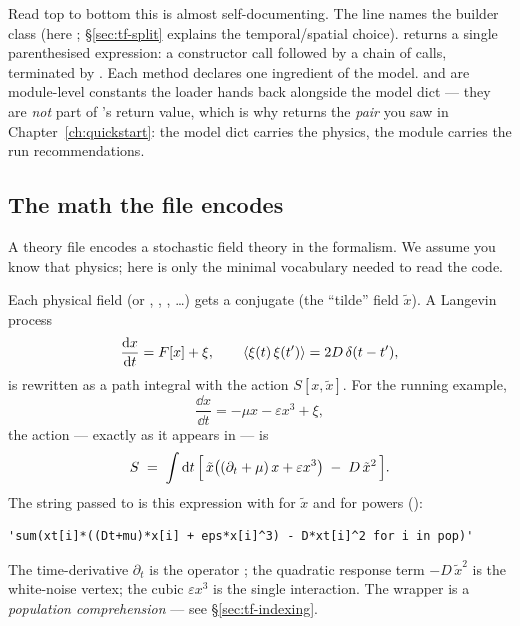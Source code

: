 Read top to bottom this is almost self-documenting. The  line names
the builder class (here ; \S\ref{sec:tf-split}
explains the temporal/spatial choice).  returns a single
parenthesised expression: a constructor call followed by a chain of
 calls, terminated by . Each method declares
one ingredient of the model.  and  are
module-level constants the loader hands back alongside the model dict --- they are
\emph{not} part of 's return value, which is why
 returns the \emph{pair}  you saw in
Chapter~\ref{ch:quickstart}: the model dict carries the physics, the module
carries the run recommendations.

\subsection{The math the file encodes}

A theory file encodes a stochastic field theory in the \msrjd{} formalism. We
assume you know that physics; here is only the minimal vocabulary needed to read
the code.

Each physical field  (or , , , \dots) gets a
conjugate   (the ``tilde'' field $\tilde x$). A
Langevin process
\[
  \frac{\mathrm{d} x}{\mathrm{d} t} = F[x] + \xi,
  \qquad \left\langle \xi(t)\,\xi(t') \right\rangle = 2D\,\delta(t-t'),
\]
is rewritten as a path integral with the \msrjd{} action $S[x,\tilde x]$. For the
running example,
\[
  \frac{\dd x}{\dd t} = -\mu x - \varepsilon x^{3} + \xi,
\]
the action --- exactly as it appears in  --- is
\begin{equation}
  S \;=\; \int \mathrm{d} t \,\Bigl[\, \tilde x\bigl((\partial_t + \mu)\,x + \varepsilon x^{3}\bigr)
       \;-\; D\,\tilde x^{2} \,\Bigr].
  \label{eq:tf-action}
\end{equation}
The string passed to  is this expression with
 for $\tilde x$ and \code{\^{}} for powers
():

\begin{lstlisting}
'sum(xt[i]*((Dt+mu)*x[i] + eps*x[i]^3) - D*xt[i]^2 for i in pop)'
\end{lstlisting}

The time-derivative $\partial_t$ is the operator ; the quadratic
response term $-D\,\tilde x^{2}$ is the white-noise vertex; the cubic
$\varepsilon x^{3}$ is the single interaction. The 
wrapper is a \emph{population comprehension} --- see \S\ref{sec:tf-indexing}.

